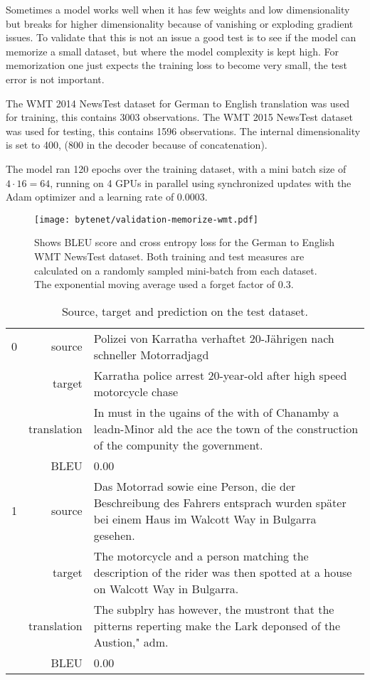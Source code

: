 Sometimes a model works well when it has few weights and low dimensionality but breaks for higher dimensionality because of vanishing or exploding gradient issues. To validate that this is not an issue a good test is to see if the model can memorize a small dataset, but where the model complexity is kept high. For memorization one just expects the training loss to become very small, the test error is not important.

The WMT 2014 NewsTest dataset for German to English translation was used for training, this contains 3003 observations. The WMT 2015 NewsTest dataset was used for testing, this contains 1596 observations. The internal dimensionality is set to 400, (800 in the decoder because of concatenation).

The model ran 120 epochs over the training dataset, with a mini batch size of ${4 \cdot 16 = 64}$, running on 4 GPUs in parallel using synchronized updates with the Adam optimizer and a learning rate of 0.0003.

\begin{figure}[h]
    \centering
    \texttt{[image: bytenet/validation-memorize-wmt.pdf]}
    \caption{Shows BLEU score and cross entropy loss for the German to English WMT NewsTest dataset. Both training and test measures are calculated on a randomly sampled mini-batch from each dataset. The exponential moving average used a forget factor of $0.3$.}
    \label{fig:result:bytenet:wmt}
\end{figure}

\begin{table}[h]
\centering
\begin{tabular}{l|r|p{10cm}}
  0 & source & Polizei von Karratha verhaftet 20-Jährigen nach schneller Motorradjagd \\[0.1cm]
    & target & Karratha police arrest 20-year-old after high speed motorcycle chase \\[0.1cm]
    & translation & In must in the ugains of the with of Chanamby a leadn-Minor ald the ace the town of the construction of the compunity the government. \\[0.1cm]
    & BLEU & 0.00 \\[0.1cm] \hline
  1 & source & Das Motorrad sowie eine Person, die der Beschreibung des Fahrers entsprach wurden später bei einem Haus im Walcott Way in Bulgarra gesehen. \\[0.1cm]
    & target & The motorcycle and a person matching the description of the rider was then spotted at a house on Walcott Way in Bulgarra. \\[0.1cm]
    & translation & The subplry has however, the mustront that the pitterns reperting make the Lark deponsed of the Austion," adm. \\[0.1cm]
    & BLEU & 0.00
\end{tabular}
\caption{Source, target and prediction on the test dataset.}
\label{table:result:bytenet:wmt-test}
\end{table}

